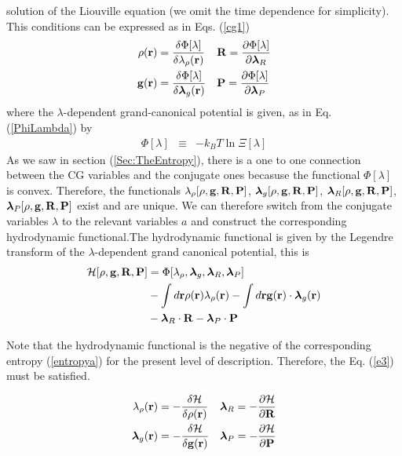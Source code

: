 \documentclass[b5paper,openright,11pt]{book}
\begin{document}
  solution of  the Liouville equation (we omit the time  dependence for simplicity). This conditions can be expressed as in Eqs. (\ref{cg1}) 
\begin{align}
  \rho({\bf r}) &=\frac{\delta \Phi [\lambda]}{\delta \lambda_\rho({\bf r}) }
&&{\bf R} =\frac{\partial \Phi [\lambda]}{\partial \boldsymbol{\lambda}_R }
\nonumber\\
  {\bf g}({\bf r}) &=\frac{\delta \Phi [\lambda]}{\delta \boldsymbol{\lambda}_g({\bf r}) }
&&{\bf P} =\frac{\partial \Phi [\lambda]}{\partial \boldsymbol{\lambda}_P }
\label{rgo}
\end{align}
where the $\lambda$-dependent grand-canonical potential is given, as in Eq. (\ref{PhiLambda}) by
\begin{eqnarray}
  \Phi [\lambda]&\equiv&-k_BT \ln\Xi [\lambda]
\label{oh}
\end{eqnarray}
As we saw in section (\ref{Sec:TheEntropy}), there is a one to one connection between the CG variables and the conjugate ones becasuse the functional $\Phi[\lambda]$ is convex.  
Therefore, the  functionals $\lambda_{\rho}[\rho,{\bf  g},{\bf R},{\bf
  P}]$,   $\boldsymbol{\lambda}_g[\rho,{\bf   g},{\bf  R},{\bf   P}]$,
$\boldsymbol{\lambda}_R[\rho,{\bf      g},{\bf      R},{\bf      P}]$,
$\boldsymbol{\lambda}_P[\rho,{\bf g},{\bf  R},{\bf P}]$ exist  and are
unique.   We  can  therefore   switch  from  the  conjugate  variables
$\lambda$   to  the   relevant   variables  $a$   and  construct   the
corresponding hydrodynamic functional.The   hydrodynamic functional   is    given   by   the   Legendre    transform   of   the $\lambda$-dependent grand canonical potential, this is
\begin{align}
{\cal H}[\rho,{\bf g},{\bf R},{\bf P}] &=
\Phi [\lambda_\rho,\boldsymbol{\lambda}_g,\boldsymbol{\lambda}_R,\boldsymbol{\lambda}_P]
\nonumber\\
& -
\int d{\bf r}\rho({\bf r})\lambda_\rho({\bf r})
-
\int d{\bf r}{\bf g}({\bf r})\cdot\boldsymbol{\lambda}_g({\bf r})
\nonumber\\
&
-\boldsymbol{\lambda}_R\cdot{\bf R}-\boldsymbol{\lambda}_P\cdot{\bf P}
\label{oleg}
\end{align}

Note that the hydrodynamic functional  is the negative of the corresponding entropy (\ref{entropya}) for the present level of description. Therefore, the Eq. (\ref{e3}) must be satisfied.

\begin{align}
  \lambda_\rho({\bf r}) &=-\frac{\delta {\cal H}}{\delta \rho({\bf r}) }
&&  \boldsymbol{\lambda}_R =-\frac{\partial {\cal H}}{\partial {\bf R} }
\nonumber\\
  \boldsymbol{\lambda}_g({\bf r}) &=-\frac{\delta {\cal H}}{\delta {\bf g}({\bf r}) }
&&  \boldsymbol{\lambda}_P =-\frac{\partial {\cal H}}{\partial{\bf P} }
\label{lno}
\end{align}
\end{document}
